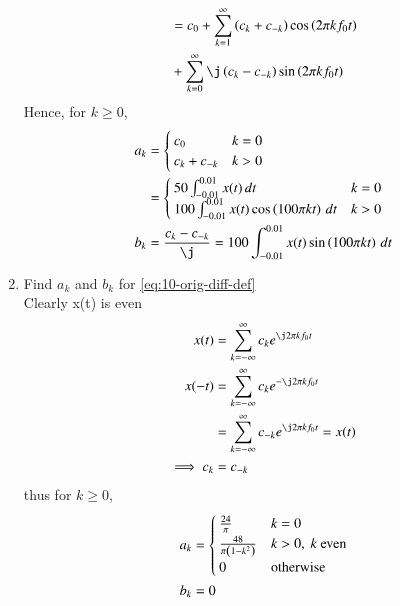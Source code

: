 \documentclass[journal,12pt,twocolumn]{IEEEtran}
\renewcommand\thesection{\arabic{section}}
\begin{document}
\begin{enumerate}[label=\thesection.\arabic*,ref=\thesection.\theenumi]
\begin{align}
         &= c_0 + \sum_{k = 1}^{\infty}\brak{c_k + c_{-k}}\cos\brak{2\pi kf_0t}  \nonumber \\
         &+ \sum_{k = 0}^{\infty}\j\brak{c_k - c_{-k}}\sin\brak{2\pi kf_0t}
\end{align}
Hence, for $k \ge 0$,
\begin{align}
    a_k &= 
    \begin{cases}
        c_0 & k = 0 \\
        c_k + c_{-k} & k > 0
    \end{cases} \label{eq:ak} \\
        &=
    \begin{cases}
        50\int_{-0.01}^{0.01}x(t)\, dt & k = 0 \\
        100\int_{-0.01}^{0.01}
        x(t)\cos\brak{100\pi kt}\, dt & k > 0
    \end{cases} \\
    b_k &= \frac{c_k - c_{-k}}{\j} = 100\int_{-0.01}^{0.01}
    x(t)\sin\brak{100\pi kt}\, dt
    \label{eq:bk}
\end{align}
\item Find $a_k$ and $b_k$ for 
	\eqref{eq:10-orig-diff-def}\\
\solution Clearly x(t) is even
\begin{align}
    x(t) &= \sum_{k = -\infty}^{\infty}c_ke^{\j2\pi kf_0 t} \\
          x(-t)&= \sum_{k = -\infty}^{\infty}c_ke^{-\j2\pi kf_0 t} \label{eq:sub} \\
          &= \sum_{k = -\infty}^{\infty}c_{-k}e^{\j2\pi kf_0 t}= x(t)\\
\implies c_k&= c_{-k}
\end{align}
thus for $k \ge 0$,
\begin{align}
    a_k &= 
    \begin{cases}
        \frac{24}{\pi} & k = 0 \\
        \frac{48}{\pi\left(1 - k^2\right)} & k > 0,\ k\ \text{even} \\
        0 & \text{otherwise}
    \end{cases} \label{eq:ak-xt}\\
    b_k &= 0
    \label{eq:bk-xt}
\end{align}


\end{enumerate}
\end{document}

